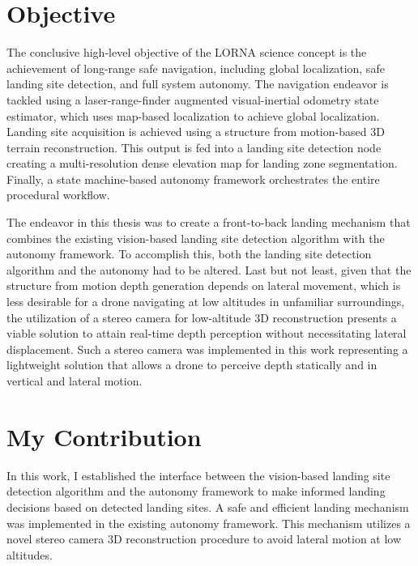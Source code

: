 \section{Objective}

The conclusive high-level objective of the LORNA science concept is the achievement of long-range safe navigation, including global localization, safe landing site detection, and full system autonomy. The navigation endeavor is tackled using a laser-range-finder augmented visual-inertial odometry state estimator, which uses map-based localization to achieve global localization. Landing site acquisition is achieved using a structure from motion-based 3D terrain reconstruction. This output is fed into a landing site detection node creating a multi-resolution dense elevation map for landing zone segmentation. Finally, a state machine-based autonomy framework orchestrates the entire procedural workflow.

The endeavor in this thesis was to create a front-to-back landing mechanism that combines the existing vision-based landing site detection algorithm with the autonomy framework. To accomplish this, both the landing site detection algorithm and the autonomy had to be altered. Last but not least, given that the structure from motion depth generation depends on lateral movement, which is less desirable for a drone navigating at low altitudes in unfamiliar surroundings, the utilization of a stereo camera for low-altitude 3D reconstruction presents a viable solution to attain real-time depth perception without necessitating lateral displacement. Such a stereo camera was implemented in this work representing a lightweight solution that allows a drone to perceive depth statically and in vertical and lateral motion.

\section{My Contribution}
In this work, I established the interface between the vision-based landing site detection algorithm and the autonomy framework to make informed landing decisions based on detected landing sites. A safe and efficient landing mechanism was implemented in the existing autonomy framework. This mechanism utilizes a novel stereo camera 3D reconstruction procedure to avoid lateral motion at low altitudes.

